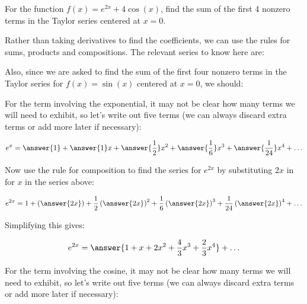 \documentclass{ximera}
\author{Jim Talamo}
\begin{document}
\begin{exercise}
For the function $f(x) = e^{2x} + 4\cos(x)$, find the sum of the first 4 nonzero terms in the Taylor series centered at $x=0$.

Rather than taking derivatives to find the coefficients, we can use the rules for sums, products and compositions. The relevant series to know here are:

\begin{multipleChoice}
\end{multipleChoice}

Also, since we are asked to find the sum of the first four nonzero terms in the Taylor series for $f(x)=\sin(x)$ centered at $x=0$, we should:

\begin{multipleChoice}
\end{multipleChoice}

\begin{exercise}
\begin{exercise}
For the term involving the exponential, it may not be clear how many terms we will need to exhibit, so let's write out five terms (we can always discard extra terms or add more later if necessary):

\[
e^x= \answer{1}+\answer{1}x+\answer{\frac{1}{2}}x^2+\answer{\frac{1}{6}}x^3+\answer{\frac{1}{24}}x^4 + \ldots
\]

\begin{exercise}
Now use the rule for composition to find the series for $e^{2x}$ by substituting $2x$ in for $x$ in the series above:

\[
e^{2x}= 1+\left(\answer{2x} \right) +\frac{1}{2} \left(\answer{2x} \right)^2 + \frac{1}{6}\left(\answer{2x} \right)^3+\frac{1}{24}\left(\answer{2x} \right)^4+ \ldots
\]

Simplifying this gives:

\[
e^{2x} = \answer{1+x+2x^2+\frac{4}{3}x^3+\frac{2}{3}x^4}+ \ldots
\]

\end{exercise}
\end{exercise}
\begin{exercise}
For the term involving the cosine, it may not be clear how many terms we will need to exhibit, so let's write out five terms (we can always discard extra terms or add more later if necessary):


\end{exercise}
\end{exercise}
\end{exercise}
\end{document}
